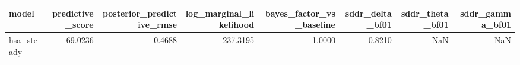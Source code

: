 \begin{tabular}{lrrrrrrr}
\toprule
model & predictive\_score & posterior\_predictive\_rmse & log\_marginal\_likelihood & bayes\_factor\_vs\_baseline & sddr\_delta\_bf01 & sddr\_theta\_bf01 & sddr\_gamma\_bf01 \\
\midrule
hsa\_steady & -69.0236 & 0.4688 & -237.3195 & 1.0000 & 0.8210 & NaN & NaN \\
\bottomrule
\end{tabular}
